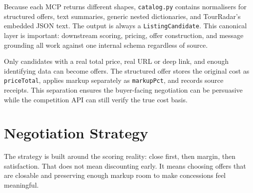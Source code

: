 \documentclass[10pt,a4paper]{article}
\begin{document}
Because each MCP returns different shapes, \texttt{catalog.py} contains normalisers for structured offers, text summaries, generic nested dictionaries, and TourRadar's embedded JSON text. The output is always a \texttt{ListingCandidate}. This canonical layer is important: downstream scoring, pricing, offer construction, and message grounding all work against one internal schema regardless of source.

Only candidates with a real total price, real URL or deep link, and enough identifying data can become offers. The structured offer stores the original cost as \texttt{priceTotal}, applies markup separately as \texttt{markupPct}, and records source receipts. This separation ensures the buyer-facing negotiation can be persuasive while the competition API can still verify the true cost basis.

\section*{Negotiation Strategy}
The strategy is built around the scoring reality: close first, then margin, then satisfaction. That does not mean discounting early. It means choosing offers that are closable and preserving enough markup room to make concessions feel meaningful.
\end{document}
